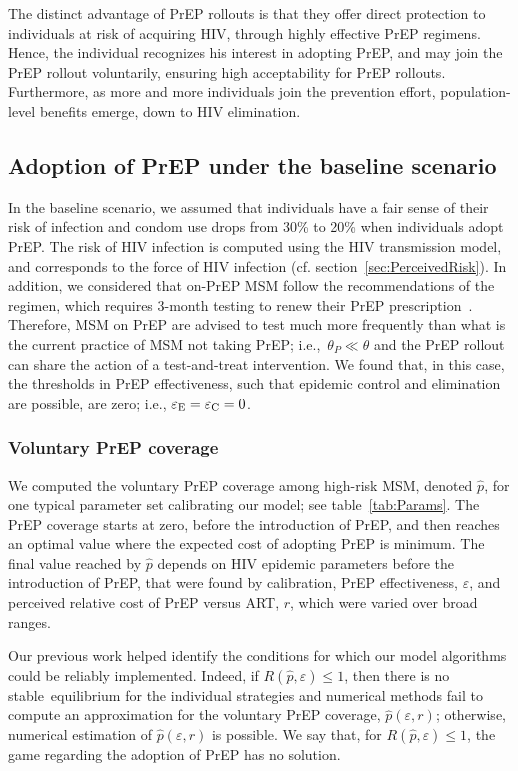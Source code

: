 \documentclass[12pt]{article}
\begin{document}
The distinct advantage of PrEP rollouts is that they offer direct protection to individuals at risk of acquiring HIV, through highly effective PrEP regimens. Hence, the individual recognizes his interest in adopting PrEP, and may join the PrEP rollout voluntarily, ensuring high acceptability for PrEP rollouts. Furthermore, as more and more individuals join the prevention effort, population-level benefits emerge, down to HIV elimination.


\subsection{Adoption of PrEP under the baseline scenario}

In the baseline scenario, we assumed that individuals have a fair sense of their risk of infection and condom use drops from 30\% to 20\% when individuals adopt PrEP.\cite{Molina2015} The risk of HIV infection is computed using the HIV transmission model, and corresponds to the force of HIV infection (cf. section~\ref{sec:PerceivedRisk}). 
In addition, we considered that on-PrEP MSM follow the recommendations of the regimen, which requires 3-month testing to renew their PrEP prescription~\cite{Molina2015}. Therefore, MSM on PrEP are advised to test much more frequently than what is the current practice of MSM not taking PrEP; i.e.,~$\theta_P \ll \theta$ and the PrEP rollout can share the action of a test-and-treat intervention. We found that, in this case, the thresholds in PrEP effectiveness, such that epidemic control and elimination are possible, are zero; i.e., $\varepsilon_{\rm E} = \varepsilon_{\rm C} = 0$.


\subsubsection{Voluntary PrEP coverage}

We computed the voluntary PrEP coverage among high-risk MSM, denoted $\hat{p}$, for one typical parameter set calibrating our model; see table~\ref{tab:Params}. The PrEP coverage starts at zero, before the introduction of PrEP, and then reaches an optimal value where the expected cost of adopting PrEP is minimum. The final value reached by $\hat{p}$ depends on HIV epidemic parameters before the introduction of PrEP, that were found by calibration, PrEP effectiveness, $\varepsilon$, and perceived relative cost of PrEP versus ART, $r$, which were varied over broad ranges. 

Our previous work \cite{Jijon2017} helped identify the conditions for which our model algorithms could be reliably implemented. Indeed, if $R(\hat{p},\varepsilon) \leq 1$, then there is no stable~equilibrium for the individual strategies and numerical methods fail to compute an approximation for the voluntary PrEP coverage, $\hat{p}(\varepsilon, r)$; otherwise, numerical estimation of $\hat{p}(\varepsilon, r)$ is possible. We say that, for $R(\hat{p},\varepsilon) \leq 1$, the game regarding the adoption of PrEP has no solution.
\end{document}
